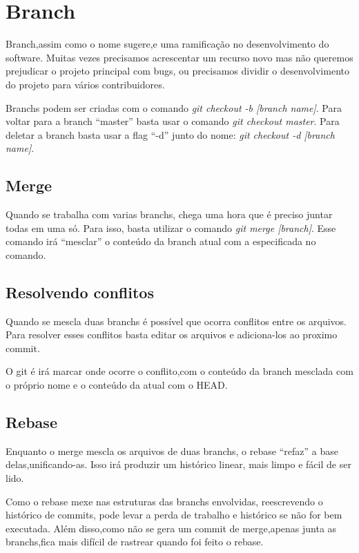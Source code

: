 \documentclass[]{article}
\begin{document}
\section{Branch}

Branch,assim como o nome sugere,e uma ramificação no desenvolvimento do software.
Muitas vezes precisamos acrescentar um recurso novo mas não queremos prejudicar o projeto principal com bugs, 
ou precisamos dividir o desenvolvimento do projeto para vários contribuidores.


Branchs podem ser criadas com o comando \textit{git checkout -b [branch name]}.
Para voltar para a branch ``master'' basta usar o comando \textit{git checkout master}.
Para deletar a branch basta usar a flag ``-d'' junto do nome: \textit{git checkout -d [branch name]}.

\subsection*{Merge}

Quando se trabalha com varias branchs, chega uma hora que é preciso juntar todas em uma só.
 Para isso, basta utilizar o comando \textit{git merge [branch]}.
 Esse comando irá ``mesclar'' o conteúdo da branch atual com a especificada no comando.

\subsection*{Resolvendo conflitos}
Quando se mescla duas branchs é possível que ocorra conflitos entre os arquivos.
Para resolver esses conflitos basta editar os arquivos e adiciona-los ao proximo commit.

O git é irá marcar onde ocorre o conflito,com o conteúdo da branch mesclada com o próprio nome e o conteúdo da atual com o HEAD.

\subsection*{Rebase}
Enquanto o merge mescla os arquivos de duas branchs, o rebase ``refaz'' a base delas,unificando-as.
Isso irá produzir um histórico linear, mais limpo e fácil de ser lido. 

Como o rebase mexe nas estruturas das branchs envolvidas, reescrevendo o histórico de commits, pode levar a perda de trabalho e histórico se não for bem executada.
Além disso,como não se gera um commit de merge,apenas junta as branchs,fica mais difícil de rastrear quando foi feito o rebase.
\end{document}
